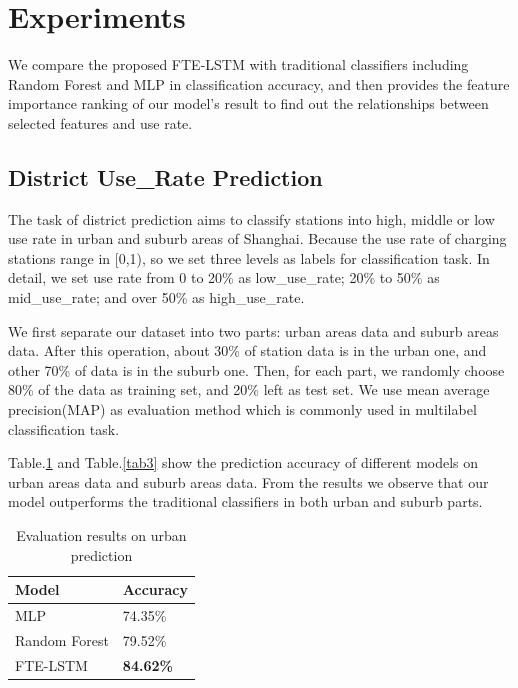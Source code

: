 \documentclass[runningheads]{llncs}
\begin{document}
\section{Experiments}
We compare the proposed FTE-LSTM with traditional classifiers including Random Forest and MLP in classification accuracy, and then provides the feature importance ranking of our model's result to find out the relationships between selected features and use rate.
\subsection{District Use\_Rate Prediction}
The task of district prediction aims to classify stations into high, middle or low use rate in urban and suburb areas of Shanghai. Because the use rate of charging stations range in [0,1), so we set three levels as labels for classification task. In detail, we set use rate from 0 to 20\% as low\_use\_rate; 20\% to 50\% as mid\_use\_rate; and over 50\% as high\_use\_rate.

We first separate our dataset into two parts: urban areas data and suburb areas data. After this operation, about 30\% of station data is in the urban one, and other 70\% of data is in the suburb one. Then, for each part, we randomly choose 80\% of the data as training set, and 20\% left as test set. We use mean average precision(MAP) as evaluation method which is commonly used in multilabel classification task.

Table.\ref{tab2} and Table.\ref{tab3} show the prediction accuracy of different models on urban areas data and suburb areas data. From the results we observe that our model outperforms the traditional classifiers in both urban and suburb parts.
\begin{table}[htbp]
	\caption{Evaluation results on urban prediction}
	\begin{center}
		\begin{tabular}{|l|l|}
			\hline
			Model & Accuracy\\
			\hline
			MLP & 74.35\%\\
			\hline
			Random Forest & 79.52\%\\
			\hline
			FTE-LSTM & \textbf{84.62\%}\\
			\hline
		\end{tabular}
		\label{tab2}
	\end{center}
\end{table}
\end{document}
